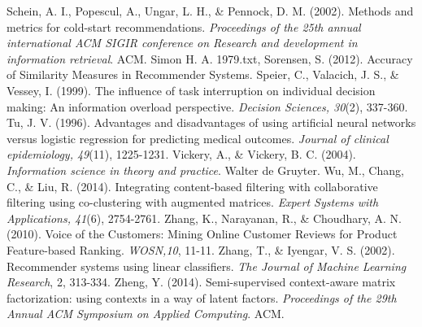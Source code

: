 \documentclass[12pt]{article}
\begin{document}
\begin{thebibliography}{100}
 Schein, A. I., Popescul, A., Ungar, L. H., \& Pennock, D. M. (2002). Methods and metrics for cold-start recommendations. \textit{Proceedings of the 25th annual international ACM SIGIR conference on Research and development in information retrieval}. ACM.
 Simon H. A. 1979.txt,
 Sorensen, S. (2012). Accuracy of Similarity Measures in Recommender Systems.
 Speier, C., Valacich, J. S., \& Vessey, I. (1999). The influence of task interruption on individual decision making: An information overload perspective. \textit{Decision Sciences, 30}(2), 337-360.
 Tu, J. V. (1996). Advantages and disadvantages of using artificial neural networks versus logistic regression for predicting medical outcomes. \textit{Journal of clinical epidemiology, 49}(11), 1225-1231.
 Vickery, A., \& Vickery, B. C. (2004). \textit{Information science in theory and practice}. Walter de Gruyter.
 Wu, M., Chang, C., \& Liu, R. (2014). Integrating content-based filtering with collaborative filtering using co-clustering with augmented matrices. \textit{Expert Systems with Applications, 41}(6), 2754-2761.
 Zhang, K., Narayanan, R., \& Choudhary, A. N. (2010). Voice of the Customers: Mining Online Customer Reviews for Product Feature-based Ranking. \textit{WOSN,10}, 11-11.
 Zhang, T., \& Iyengar, V. S. (2002). Recommender systems using linear classifiers. \textit{The Journal of Machine Learning Research}, 2, 313-334.
 Zheng, Y. (2014). Semi-supervised context-aware matrix factorization: using contexts in a way of latent factors. \textit{Proceedings of the 29th Annual ACM Symposium on Applied Computing}. ACM.



\end{thebibliography} 

\begin{flushleft}

\end{flushleft}

\bigskip
\end{document}
